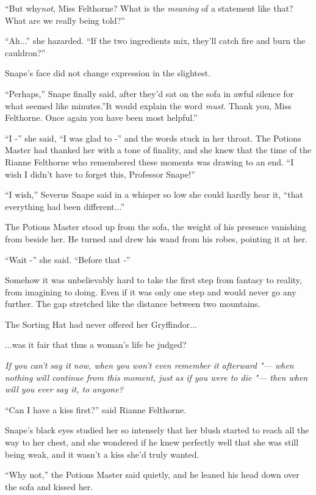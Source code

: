 ``But why\emph{not}, Miss Felthorne? What is the \emph{meaning} of a
statement like that? What are we really being told?''

``Ah...'' she hazarded. ``If the two ingredients mix, they'll catch
fire and burn the cauldron?''

Snape's face did not change expression in the slightest.

``Perhaps,'' Snape finally said, after they'd sat on the sofa in awful
silence for what seemed like minutes.''It would explain the word
\emph{must}. Thank you, Miss Felthorne. Once again you have been most
helpful.''

``I -'' she said, ``I was glad to -'' and the words stuck in her throat.
The Potions Master had thanked her with a tone of finality, and she knew
that the time of the Rianne Felthorne who remembered these moments was
drawing to an end. ``I wish I didn't have to forget this, Professor
Snape!''

``I wish,'' Severus Snape said in a whisper so low she could hardly hear
it, ``that everything had been different...''

The Potions Master stood up from the sofa, the weight of his presence
vanishing from beside her. He turned and drew his wand from his robes,
pointing it at her.

``Wait -'' she said. ``Before that -''

Somehow it was unbelievably hard to take the first step from fantasy to
reality, from imagining to doing. Even if it was only one step and would
never go any further. The gap stretched like the distance between two
mountains.

The Sorting Hat had never offered her Gryffindor...

...was it fair that thus a woman's life be judged?

\emph{If you can't} \emph{say it now, when you won't even remember it
afterward "--- when nothing will continue from this moment, just as if you
were to die "--- then when will you ever say it, to anyone?}

``Can I have a kiss first?'' said Rianne Felthorne.

Snape's black eyes studied her so intensely that her blush started to
reach all the way to her chest, and she wondered if he knew perfectly
well that she was still being weak, and it wasn't a kiss she'd truly
wanted.

``Why not,'' the Potions Master said quietly, and he leaned his head
down over the sofa and kissed her.


